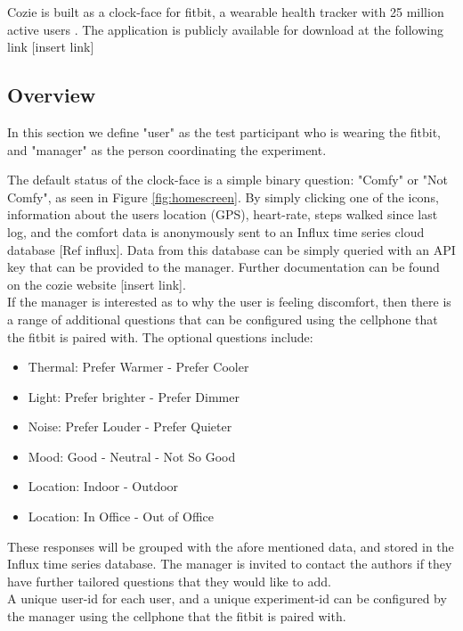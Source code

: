 
Cozie is built as a clock-face for fitbit, a wearable health tracker with 25 million active users \cite{fibit2018}. The application is publicly available for download at the following link [insert link]

\subsection{Overview}

In this section we define "user" as the test participant who is wearing the fitbit, and "manager" as the person coordinating the experiment. \ 

The default status of the clock-face is a simple binary question: "Comfy" or "Not Comfy", as seen in Figure \ref{fig:homescreen}. By simply clicking one of the icons, information about the users location (GPS), heart-rate, steps walked since last log, and the comfort data is anonymously sent to an Influx time series cloud database [Ref influx]. Data from this database can be simply queried with an API key that can be provided to the manager. Further documentation can be found on the cozie website [insert link].\\

If the manager is interested as to why the user is feeling discomfort, then there is a range of additional questions that can be configured using the cellphone that the fitbit is paired with. The optional questions include:

\begin{itemize}
  \item Thermal: Prefer Warmer - Prefer Cooler
  \item Light: Prefer brighter - Prefer Dimmer
  \item Noise: Prefer Louder - Prefer Quieter 
  \item Mood: Good - Neutral - Not So Good
  \item Location: Indoor - Outdoor
  \item Location: In Office - Out of Office
\end{itemize}

These responses will be grouped with the afore mentioned data, and stored in the Influx time series database. The manager is invited to contact the authors if they have further tailored questions that they would like to add.\\

A unique user-id for each user, and a unique experiment-id can be configured by the manager using the cellphone that the fitbit is paired with. \\

